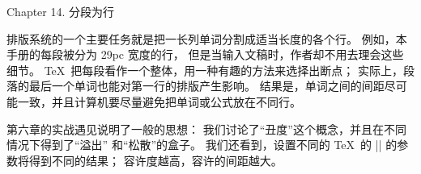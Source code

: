 


\beginchapter Chapter 14. 分段为行


\1排版系统的一个主要任务就是把一长列单词分割成适当长度的各个行。%
例如，本手册的每段被分为 29pc 宽度的行，
但是当输入文稿时，作者却不用去理会这些细节。%
 \TeX\ 把每段看作一个整体，用一种有趣的方法来选择出断点；
实际上，段落的最后一个单词也能对第一行的排版产生影响。%
结果是，单词之间的间距尽可能一致，并且计算机要尽量避免把单词或公式放在不同行。

第六章的实战遇见说明了一般的思想：
我们讨论了``丑度''这个概念，并且在不同情况下得到了``溢出''%
和``松散''的盒子。%
我们还看到，设置不同的 \TeX\ 的 |\tolerance| 的参数将得到不同的结果；
容许度越高，容许的间距越大。

